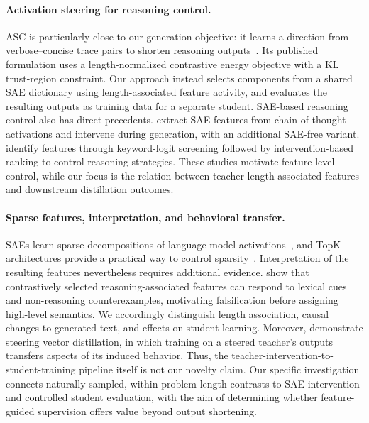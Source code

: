 \paragraph{Activation steering for reasoning control.}
ASC is particularly close to our generation objective: it learns a direction from verbose--concise trace pairs to shorten reasoning outputs~\citep{azizi2026activation}.
Its published formulation uses a length-normalized contrastive energy objective with a KL trust-region constraint.
Our approach instead selects components from a shared SAE dictionary using length-associated feature activity, and evaluates the resulting outputs as training data for a separate student.
SAE-based reasoning control also has direct precedents.
\citet{li2025feature} extract SAE features from chain-of-thought activations and intervene during generation, with an additional SAE-free variant.
\citet{fang2026controllable} identify features through keyword-logit screening followed by intervention-based ranking to control reasoning strategies.
These studies motivate feature-level control, while our focus is the relation between teacher length-associated features and downstream distillation outcomes.

\paragraph{Sparse features, interpretation, and behavioral transfer.}
SAEs learn sparse decompositions of language-model activations~\citep{cunningham2023sparse}, and TopK architectures provide a practical way to control sparsity~\citep{gao2024scaling}.
Interpretation of the resulting features nevertheless requires additional evidence.
\citet{ma2026reasoning} show that contrastively selected reasoning-associated features can respond to lexical cues and non-reasoning counterexamples, motivating falsification before assigning high-level semantics.
We accordingly distinguish length association, causal changes to generated text, and effects on student learning.
Moreover, \citet{blank2026subliminal} demonstrate steering vector distillation, in which training on a steered teacher's outputs transfers aspects of its induced behavior.
Thus, the teacher-intervention-to-student-training pipeline itself is not our novelty claim.
Our specific investigation connects naturally sampled, within-problem length contrasts to SAE intervention and controlled student evaluation, with the aim of determining whether feature-guided supervision offers value beyond output shortening.
